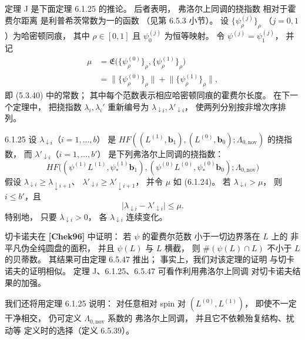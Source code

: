 定理 J 是下面定理 6.1.25 的推论。
后者表明，
弗洛尔上同调的挠指数
相对于霍费尔距离
是利普希茨常数为一的函数
（见第 6.5.3 小节）。
设
$\{\psi_\rho^{(j)}\}_\rho$
（$j=0,1$）为哈密顿同痕，
其中 $\rho\in[0,1]$ 且
$\psi_0^{(j)}$ 为恒等映射。
令 $\psi^{(j)}=\psi_1^{(j)}$，
并记
\begin{equation}
\begin{aligned}
\mu
&=\mathfrak E
\bigl(\{\psi_\rho^{(0)}\}_\rho,
\{\psi_\rho^{(1)}\}_\rho\bigr)\\
&=\bigl\|\{\psi_\rho^{(0)}\}_\rho\bigr\|
+\bigl\|\{\psi_\rho^{(1)}\}_\rho\bigr\|,
\end{aligned}
\tag{6.1.24}\label{eq:6-1-24}
\end{equation}
即 (5.3.40) 中的常数；
其中每个范数表示相应哈密顿同痕的霍费尔长度。
在下一个定理中，
把挠指数 $\lambda_i,\lambda_i'$ 重新编号为
$\lambda_{\downarrow i},
\lambda'_{\downarrow i}$，
使两列分别按非增次序排列。

\begin{theorem}{6.1.25}\label{thm:6-1-25}
设 $\lambda_{\downarrow i}$（$i=1,\ldots,b$）
是
$HF((L^{(1)},\mathbf b_1),
(L^{(0)},\mathbf b_0);
\Lambda_{0,\mathrm{nov}})$
的挠指数，
而 $\lambda'_{\downarrow i}$（$i=1,\ldots,b'$）
是下列弗洛尔上同调的挠指数：
\[
HF\bigl(
(\psi^{(1)}L^{(1)},\psi^{(1)}_*\mathbf b_1),
(\psi^{(0)}L^{(0)},\psi^{(0)}_*\mathbf b_0);
\Lambda_{0,\mathrm{nov}}
\bigr)
\]
假设
$\lambda_{\downarrow i}\ge
\lambda_{\downarrow i+1}$、
$\lambda'_{\downarrow i}\ge
\lambda'_{\downarrow i+1}$，
并令 $\mu$ 如 (6.1.24)。
若 $\lambda_{\downarrow i}>\mu$，
则 $i\le b'$，且
\[
\bigl|\lambda_{\downarrow i}
-\lambda'_{\downarrow i}\bigr|\le\mu.
\]
特别地，
只要 $\lambda_{\downarrow i}>0$，
各 $\lambda_{\downarrow i}$ 连续变化。
\end{theorem}

切卡诺夫在 \textbf{[Chek96]} 中证明：
若 $\psi$ 的霍费尔范数
小于一切边界落在 $L$ 上的
非平凡伪全纯圆盘的面积，
并且 $\psi(L)$ 与 $L$ 横截，
则 $\#(\psi(L)\cap L)$
不小于 $L$ 的贝蒂数。
其结果可由定理 6.5.47 推出；
事实上，我们对该定理的证明
与切卡诺夫的证明相似。
定理 J、6.1.25、6.5.47
可看作利用弗洛尔上同调
对切卡诺夫结果的加强。

我们还将用定理 6.1.25 说明：
对任意相对 spin 对
$(L^{(0)},L^{(1)})$，
即使不一定干净相交，
仍可定义 $\Lambda_{0,\mathrm{nov}}$ 系数的
弗洛尔上同调，
并且它不依赖殆复结构、扰动等
定义时的选择（定义 6.5.39）。

